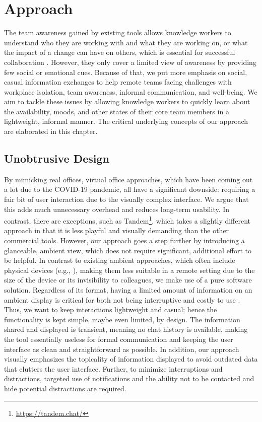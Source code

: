 \chapter{Approach}
\label{chapter:approach}
The team awareness gained by existing tools allows knowledge workers to understand who they are working with and what they are working on, or what the impact of a change can have on others, which is essential for successful collaboration \autocite{dourish1992awareness}. However, they only cover a limited view of awareness by providing few social or emotional cues. Because of that, we put more emphasis on social, casual information exchanges to help remote teams facing challenges with workplace isolation, team awareness, informal communication, and well-being. We aim to tackle these issues by allowing knowledge workers to quickly learn about the availability, moods, and other states of their core team members in a lightweight, informal manner. The critical underlying concepts of our approach are elaborated in this chapter.

\section{Unobtrusive Design}
By mimicking real offices, virtual office approaches, which have been coming out a lot due to the COVID-19 pandemic, all have a significant downside: requiring a fair bit of user interaction due to the visually complex interface. We argue that this adds much unnecessary overhead and reduces long-term usability. In contrast, there are exceptions, such as Tandem\footnote{\url{https://tandem.chat/}}, which takes a slightly different approach in that it is less playful and visually demanding than the other commercial tools. However, our approach goes a step further by introducing a glanceable, ambient view, which does not require significant, additional effort to be helpful. In contrast to existing ambient approaches, which often include physical devices (e.g., \autocite{ downs2012ambient, alavi2012ambient, rocker2004using}), making them less suitable in a remote setting due to the size of the device or its invisibility to colleagues, we make use of a pure software solution. Regardless of its format, having a limited amount of information on an ambient display is critical for both not being interruptive and costly to use \autocite{dabbish2004controlling}. Thus, we want to keep interactions lightweight and casual; hence the functionality is kept simple, maybe even limited, by design. The information shared and displayed is transient, meaning no chat history is available, making the tool essentially useless for formal communication and keeping the user interface as clean and straightforward as possible. In addition, our approach visually emphasizes the topicality of information displayed to avoid outdated data that clutters the user interface. Further, to minimize interruptions and distractions, targeted use of notifications and the ability not to be contacted and hide potential distractions are required.

